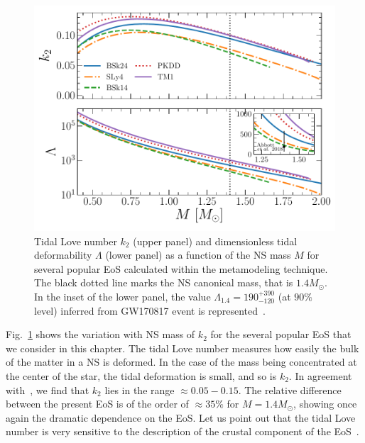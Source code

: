 \begin{figure}[!t]
  \begin{center}
    \includegraphics[width=0.9\linewidth]{figures/tidal_popular.pdf}
  \end{center}
  \caption[Tidal Love number and dimensionless tidal deformability versus 
  neutron star mass for several popular equations of state]{Tidal Love number 
    $k_2$ (upper panel) and 
    dimensionless tidal deformability $\Lambda$ (lower panel) as a function of 
    the NS mass $M$ for several popular EoS calculated within the metamodeling 
  technique. The black dotted line marks the NS canonical mass, that is
$1.4M_\odot$. In the inset of the lower panel, the value 
$\Lambda_{1.4} = 190_{-120}^{+390}$ (at $90\%$ level) inferred from GW170817 
event is represented~\cite{GW1}.}\label{fig:tidal_popular}
\end{figure}

Fig.~\ref{fig:tidal_popular} shows the variation with NS mass of $k_2$ for the 
several popular EoS that we consider in this chapter. The tidal Love number
measures how easily the bulk of the matter in a NS is deformed. In the case
of the mass being concentrated at the center of the star, the tidal deformation 
is small, and so is $k_2$. In agreement with~\cite{Hinderer2010}, we find that 
$k_2$ lies in the range $\approx 0.05-0.15$. The relative difference between
the present EoS is of the order of $\approx 35\%$ for $M=1.4M_\odot$, showing
once again the dramatic dependence on the EoS. Let us point out that the tidal 
Love number is very sensitive to the description of the crustal component of 
the EoS~\cite{Piekarewicz2019}.

